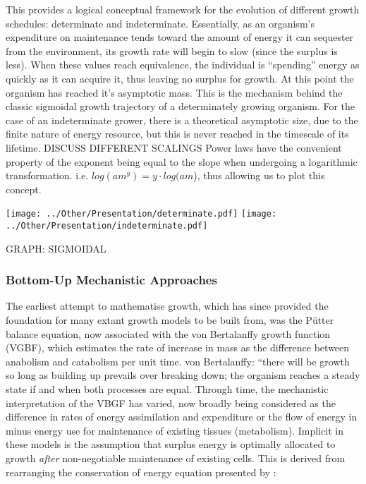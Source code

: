 \documentclass[a4paper]{article} %
\begin{document}
        This provides a logical conceptual framework for the evolution of different growth schedules: determinate and indeterminate. Essentially, as an organism's expenditure on maintenance tends toward the amount of energy it can sequester from the environment, its growth rate will begin to slow (since the surplus is less). When these values reach equivalence, the individual is ``spending'' energy as quickly as it can acquire it, thus leaving no surplus for growth. At this point the organism has reached it's asymptotic mass. This is the mechanism behind the classic sigmoidal growth trajectory of a determinately growing organism. For the case of an indeterminate grower, there is a theoretical asymptotic size, due to the finite nature of energy resource, but this is never reached in the timescale of its lifetime. 
        DISCUSS DIFFERENT SCALINGS
        Power laws have the convenient property of the exponent being equal to the slope when undergoing a logarithmic transformation. i.e. $log(am^y) = y\cdot log(am$), thus allowing us to plot this concept.

        \texttt{[image: ../Other/Presentation/determinate.pdf]}
        \texttt{[image: ../Other/Presentation/indeterminate.pdf]}

        GRAPH: SIGMOIDAL

        \subsubsection{Bottom-Up Mechanistic Approaches}
            The earliest attempt to mathematise growth, which has since provided the foundation for many extant growth models to be built from, was the P\"{u}tter balance equation, now associated with the von Bertalanffy growth function (VGBF), which estimates the rate of increase in mass as the difference between anabolism and catabolism per unit time. \autocite{Putter1920, vonBert1938, VonBertalanffy1957,Marshall2019b}
            von Bertalanffy: ``there will be growth so long as building up prevails over breaking down; the organism reaches a steady state if and when both processes are equal. Through time, the mechanistic interpretation of the VBGF has varied, now broadly being considered as the difference in rates of energy assimilation and expenditure or the flow of energy in minus energy use for maintenance of existing tissues (metabolism). Implicit in these models is the assumption that surplus energy is optimally allocated to growth \textit{after} non-negotiable maintenance of existing cells. This is derived from rearranging the conservation of energy equation presented by \cite{West2001}:
\end{document}
